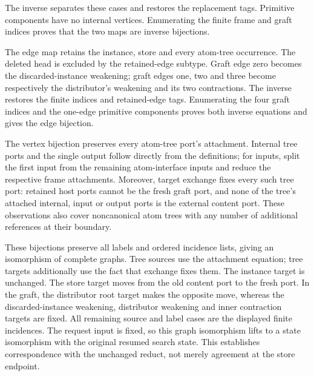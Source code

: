The inverse separates these cases and restores the replacement tags.
Primitive components have no internal vertices. Enumerating the finite
frame and graft indices proves that the two maps are inverse bijections.



The edge map retains the instance, store and every atom-tree occurrence.
The deleted head is excluded by the retained-edge subtype. Graft edge zero
becomes the discarded-instance weakening; graft edges one, two and three
become respectively the distributor's weakening and its two contractions.
The inverse restores the finite indices and retained-edge tags. Enumerating
the four graft indices and the one-edge primitive components proves both
inverse equations and gives the edge bijection.




The vertex bijection preserves every atom-tree port's attachment. Internal
tree ports and the single output follow directly from the definitions; for
inputs, split the first input from the remaining atom-interface inputs and
reduce the respective frame attachments. Moreover, target exchange fixes
every such tree port: retained host ports cannot be the fresh graft port,
and none of the tree's attached internal, input or output ports is the
external content port. These observations also cover noncanonical atom trees
with any number of additional references at their boundary.



These bijections preserve all labels and ordered incidence lists, giving
an isomorphism of complete graphs. Tree sources use the attachment equation;
tree targets additionally use the fact that exchange fixes them. The instance
target is unchanged. The store target moves from the old content port to
the fresh port. In the graft, the distributor root target makes the opposite
move, whereas the discarded-instance weakening, distributor weakening and
inner contraction targets are fixed. All remaining source and label cases
are the displayed finite incidences. The request input is fixed, so this
graph isomorphism lifts to a state isomorphism with the original resumed
search state. This establishes correspondence with the unchanged reduct,
not merely agreement at the store endpoint.

